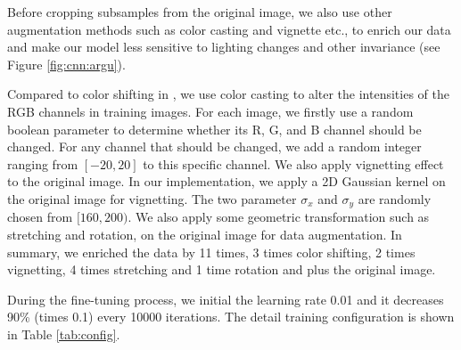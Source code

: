 Before cropping subsamples from the original image, we also use other augmentation methods such as color casting and vignette etc., to enrich our data and make our model less sensitive to lighting changes and other invariance (see Figure \ref{fig:cnn:argu}). 

Compared to color shifting in \cite{krizhevsky2012imagenet}, we use color casting to alter the intensities of the RGB channels in training images. For each image, we firstly use a random boolean parameter to determine whether its R, G, and B channel should be changed. For any channel that should be changed, we add a random integer ranging from $[-20 , 20]$ to this specific channel. We also apply vignetting effect to the original image. In our implementation, we apply a 2D Gaussian kernel on the original image for vignetting. The two parameter $\sigma_x$ and $\sigma_y$ are randomly chosen from $[160,200)$. We also apply some geometric transformation such as stretching and rotation, on the original image for data augmentation. In summary, we enriched the data by 11 times, 3 times color shifting, 2 times vignetting, 4 times stretching and 1 time rotation and plus the original image.

During the fine-tuning process, we initial the learning rate 0.01 and it decreases 90\% (times 0.1) every 10000 iterations. The detail training configuration is shown in Table \ref{tab:config}.

